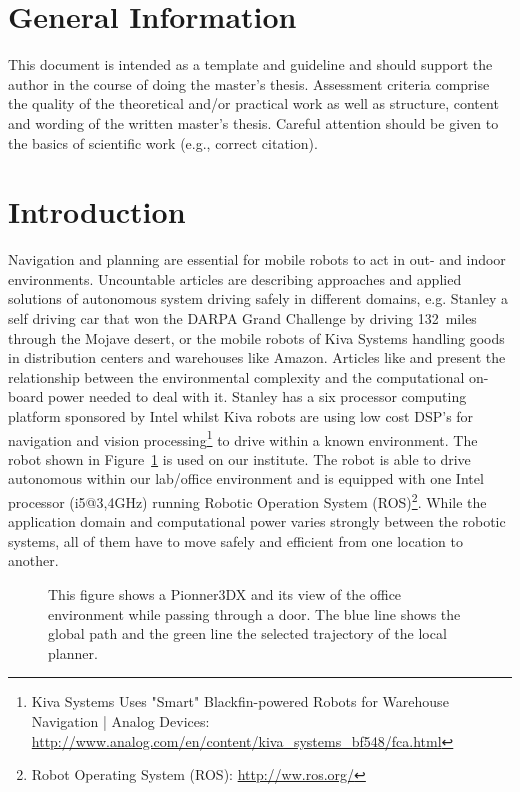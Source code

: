 \section{General Information}

This document is intended as a template and guideline and should support the author in the course of doing the master's thesis.
Assessment criteria comprise the quality of the theoretical and/or practical work as well as structure, content and wording of the written master's thesis. Careful attention should be given to the basics of scientific work (e.g., correct citation).

\section{Introduction}
Navigation and planning are essential for mobile robots to act in out- and indoor environments. 
Uncountable articles are describing approaches and applied solutions of autonomous system driving safely in different domains, e.g. Stanley \cite{stanley} a self driving car that won the DARPA Grand Challenge by driving 132~miles through the Mojave desert, or the mobile robots of Kiva Systems \cite{kiva} handling goods in distribution centers and warehouses like Amazon. 
Articles like \cite{stanley} and \cite{kiva} present the relationship between the environmental complexity and the computational on-board power needed to deal with it.
Stanley has a six processor computing platform sponsored by Intel whilst Kiva robots are using low cost DSP's for navigation and vision processing\footnote{Kiva Systems Uses "Smart" Blackfin-powered Robots for Warehouse Navigation | Analog Devices: \url{http://www.analog.com/en/content/kiva_systems_bf548/fca.html}} to drive within a known environment. 
The robot shown in Figure~\ref{fig:fig_pioneer} is used on our institute. The robot is able to drive autonomous within our lab/office environment and is equipped with one Intel processor (i5@3,4GHz) running Robotic Operation System (ROS)\footnote{Robot Operating System (ROS): \url{http://ww.ros.org/}}.  
While the application domain and computational power varies strongly between the robotic systems, all of them have to move safely and efficient from one location to another. 

   \begin{figure}[thpb]
      \centering
      \def\svgwidth{0.7\textwidth}
      
      \caption{This figure shows a Pionner3DX and its view of the office environment while passing through a door. The blue line shows the global path and the green line the selected trajectory of the local planner.}
      \label{fig:fig_pioneer}
   \end{figure}

